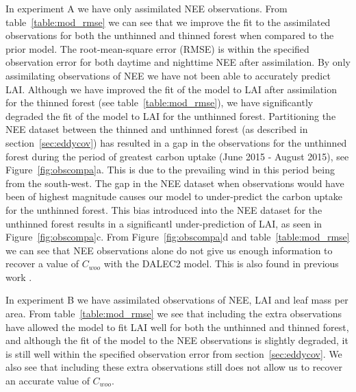 In experiment A we have only assimilated NEE observations. From table~\ref{table:mod_rmse} we can see that we improve the fit to the assimilated observations for both the unthinned and thinned forest when compared to the prior model. The root-mean-square error (RMSE) is within the specified observation error for both daytime and nighttime NEE after assimilation. By only assimilating observations of NEE we have not been able to accurately predict LAI. Although we have improved the fit of the model to LAI after assimilation for the thinned forest (see table~\ref{table:mod_rmse}), we have significantly degraded the fit of the model to LAI for the unthinned forest. Partitioning the NEE dataset between the thinned and unthinned forest (as described in section~\ref{sec:eddycov}) has resulted in a gap in the observations for the unthinned forest during the period of greatest carbon uptake (June 2015 - August 2015), see Figure~\ref{fig:obscompa}a. This is due to the prevailing wind in this period being from the south-west. The gap in the NEE dataset when observations would have been of highest magnitude causes our model to under-predict the carbon uptake for the unthinned forest. This bias introduced into the NEE dataset for the unthinned forest results in a significantl under-prediction of LAI, as seen in Figure~\ref{fig:obscompa}c. From Figure~\ref{fig:obscompa}d and table~\ref{table:mod_rmse} we can see that NEE observations alone do not give us enough information to recover a value of \(C_{woo}\) with the DALEC2 model. This is also found in previous work \citep{fox2009reflex}.

In experiment B we have assimilated observations of NEE, LAI and leaf mass per area. From table~\ref{table:mod_rmse} we see that including the extra observations have allowed the model to fit LAI well for both the unthinned and thinned forest, and although the fit of the model to the NEE observations is slightly degraded, it is still well within the specified observation error from section~\ref{sec:eddycov}. We also see that including these extra observations still does not allow us to recover an accurate value of \(C_{woo}\).      

